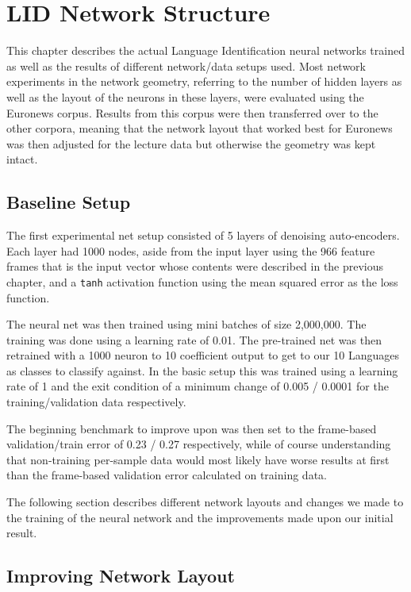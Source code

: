 \chapter{LID Network Structure}
\label{ch:LIDNetwork}

This chapter describes the actual Language Identification neural networks trained as well as the results of different network/data setups used. Most network experiments in the network geometry, referring to the number of hidden layers as well as the layout of the neurons in these layers, were evaluated using the Euronews corpus. Results from this corpus were then transferred over to the other corpora, meaning that the network layout that worked best for Euronews was then adjusted for the lecture data but otherwise the geometry was kept intact.

\section{Baseline Setup}
\label{sec:LIDNetwork:Basic}

The first experimental net setup consisted of 5 layers of denoising auto-encoders. Each layer had 1000 nodes, aside from the input layer using the 966 feature frames that is the input vector whose contents were described in the previous chapter, and a \texttt{tanh} activation function using the mean squared error as the loss function. 

The neural net was then trained using mini batches of size 2,000,000. The training was done using a learning rate of 0.01. The pre-trained net was then retrained with a 1000 neuron to 10 coefficient output to get to our 10 Languages as classes to classify against. In the basic setup this was trained using a learning rate of 1 and the exit condition of a minimum change of 0.005 / 0.0001 for the training/validation data respectively.

The beginning benchmark to improve upon was then set to the frame-based validation/train error of 0.23 / 0.27 respectively, while of course understanding that non-training per-sample data would most likely have worse results at first than the frame-based validation error calculated on training data.

The following section describes different network layouts and changes we made to the training of the neural network and the improvements made upon our initial result.

\section{Improving Network Layout}
\label{sec:LIDNetwork:Layout}

